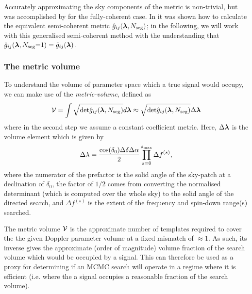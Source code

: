 \documentclass[aps, prd, twocolumn, superscriptaddress, floatfix, showpacs, nofootinbib, longbibliography]{revtex4-1}
\begin{document}
Accurately approximating the sky components of the metric is non-trivial, but
was accomplished by \citet{wette2013} for the fully-coherent case. In
\citet{wette2015} it was shown how to calculate the equivalent semi-coherent
metric $\hat{g}_{ij}(\boldsymbol{\mathbf{\lambda}}, N_{\rm seg})$; in the following, we
will work with this generalised semi-coherent method with the understanding
that $\hat{g}_{ij}(\boldsymbol{\mathbf{\lambda}}, N_{\rm seg}{=}1)=
\tilde{g}_{ij}(\boldsymbol{\mathbf{\lambda}})$.

\subsubsection{The metric volume}
To understand the volume of parameter space which a true signal would occupy,
we can make use of the \emph{metric-volume}, defined as \citep{prix2007}
\begin{align}
\mathcal{V} = \int
\sqrt{\textrm{det}\hat{g}_{ij}(\boldsymbol{\mathbf{\lambda}}, N_{\rm seg})} d\boldsymbol{\mathbf{\lambda}} \approx
\sqrt{\textrm{det}\hat{g}_{ij}(\boldsymbol{\mathbf{\lambda}}, N_{\rm seg})} \Delta\boldsymbol{\mathbf{\lambda}}
\end{align}
where in the second step we assume a constant coefficient metric. Here, $\Delta
\boldsymbol{\mathbf{\lambda}}$ is the volume element which is given by
\begin{equation}
\Delta\lambda = \frac{\cos(\delta_0)\Delta\delta\Delta\alpha}{2}
\prod_{s=0}^{s_{\textrm{max}}} \Delta f^{(s)},
\end{equation}
where the numerator of the prefactor is the solid angle of the sky-patch at a
declination of $\delta_0$, the factor of $1/2$ comes from converting the
normalised determinant (which is computed over the whole sky) to the solid angle
of the directed search, and $\Delta f^{(s)}$ is the extent of the frequency and
spin-down range(s) searched.

The metric volume $\mathcal{V}$ is the approximate number of templates required to cover
the the given Doppler parameter volume at a fixed mismatch of $\approx 1$. As
such, its inverse gives the approximate (order of magnitude) volume fraction of
the search volume which would be occupied by a signal. This can therefore be
used as a proxy for determining if an MCMC search will operate in a regime where
it is efficient (i.e. where the a signal occupies a reasonable fraction of the
search volume).
\end{document}
